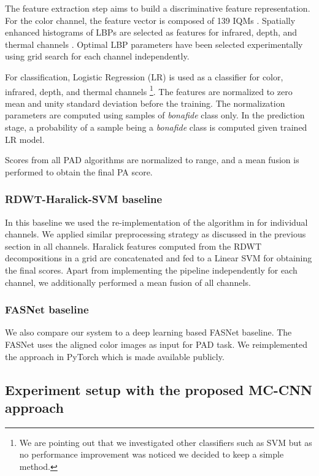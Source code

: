 \documentclass[journal]{IEEEtran}
\begin{document}
The feature extraction step aims to build a discriminative feature representation. For the color channel, the feature vector is composed of 139 IQMs \cite{nikisins2018effectiveness}. Spatially enhanced histograms of LBPs are selected as features for infrared, depth, and thermal channels \cite{nikisins2018effectiveness}. Optimal LBP parameters have been selected experimentally using grid search for each channel independently.

For classification, Logistic Regression (LR) is used as a classifier for color, infrared, depth, and thermal channels \footnote{ We are pointing out that we investigated other classifiers such as SVM but as no performance improvement was noticed we decided to keep a simple method.}. The features are normalized to zero mean and unity standard deviation before the training. The normalization parameters are computed using samples of \textit{bonafide} class only. In the prediction stage, a probability of a sample being a \textit{bonafide} class is computed given trained LR model.

Scores from all PAD algorithms are normalized to  range, and a mean fusion is performed to obtain the final PA score.


\subsubsection{RDWT-Haralick-SVM baseline}

In this baseline we used the re-implementation of the algorithm in \cite{agarwal2017face} for individual channels. We applied similar preprocessing strategy as discussed in the previous section in all channels. Haralick \cite{haralick1979statistical} features computed from the RDWT decompositions in a  grid are concatenated and fed to a Linear SVM for obtaining the final scores. Apart from implementing the pipeline independently for each channel, we additionally performed a mean fusion of all channels.  


\subsubsection{FASNet baseline}

We also compare our system to a deep learning based FASNet \cite{lucena2017transfer} baseline. The FASNet
uses the aligned color images as input for PAD task. We reimplemented the approach in PyTorch \cite{paszke2017automatic} which is made available publicly. 

\subsection{Experiment setup with the proposed MC-CNN approach}
\end{document}
